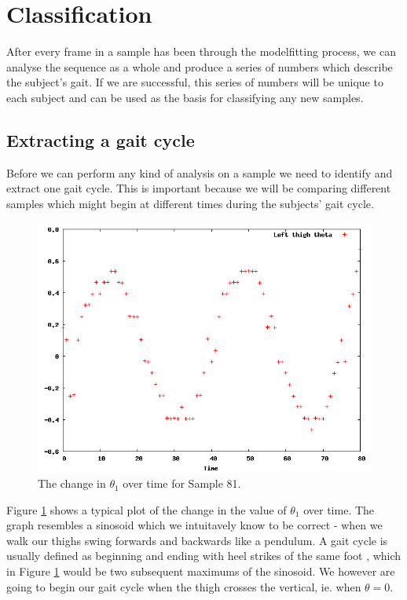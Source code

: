 \section{Classification}

After every frame in a sample has been through the modelfitting process, we can analyse the sequence as a whole
and produce a series of numbers which describe the subject's gait.
If we are successful, this series of numbers will be unique to each subject and can be used as the basis for classifying any new samples.


\subsection{Extracting a gait cycle}
\label{ExtractingGaitCycle}

Before we can perform any kind of analysis on a sample we need to identify and extract one gait cycle.
This is important because we will be comparing different samples which might begin at different times during the subjects' gait cycle.

\begin{figure}[tb]
	\centering
	\includegraphics[width=\textwidth]{curvefitting.png}
	\caption{The change in $\theta_1$ over time for Sample 81.}
	\label{CurveFitting1}
\end{figure}

Figure \ref{CurveFitting1} shows a typical plot of the change in the value of $\theta_1$ over time.
The graph resembles a sinosoid which we intuitavely know to be correct - when we walk our thighs swing forwards and backwards like a pendulum.
A gait cycle is usually defined as beginning and ending with heel strikes of the same foot \cite{PIEEE}, which in Figure \ref{CurveFitting1} would be two subsequent maximums of the sinosoid.
We however are going to begin our gait cycle when the thigh crosses the vertical, ie. when $\theta = 0$.

